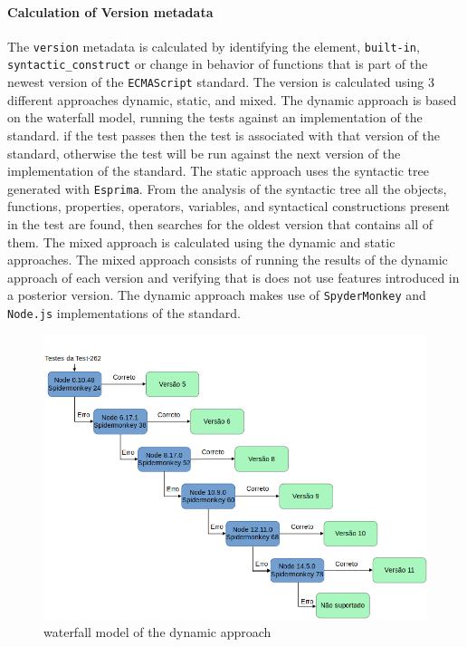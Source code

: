 \documentclass[runningheads]{llncs}
\begin{document}
\paragraph{Calculation of Version metadata}
The \texttt{version} metadata is calculated by identifying the element, \texttt{built-in}, \texttt{syntactic\_construct} or change in behavior of functions that is part of the newest version of the \texttt{ECMAScript} standard. The version is calculated using 3 different approaches dynamic, static, and mixed.
%
The dynamic approach is based on the waterfall model, running the tests against an implementation of the standard. if the test passes then the test is associated with that version of the standard, otherwise the test will be run against the next version of the implementation of the standard.
%
The static approach uses the syntactic tree generated with \texttt{Esprima}. From the analysis of the syntactic tree all the objects, functions, properties, operators, variables, and syntactical constructions present in the test are found, then searches for the oldest version that contains all of them.
%
The mixed approach is calculated using the dynamic and static approaches. The mixed approach consists of running the results of the dynamic approach of each version and verifying that is does not use features introduced in a posterior version. The dynamic approach makes use of \texttt{SpyderMonkey} and \texttt{Node.js} implementations of the standard. 

\begin{figure}[ht]
    \centering
    \includegraphics[width=1\textwidth]{images/waterfall_model.png}
    \caption{waterfall model of the dynamic approach}
    \label{fig:waterfall_model}
\end{figure}
\end{document}
